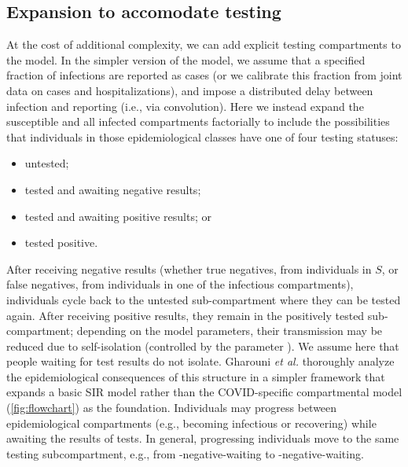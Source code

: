 \documentclass[12pt]{article}\usepackage[]{graphicx}\usepackage[]{color}
\begin{document}
\subsection*{Expansion to accomodate testing}

At the cost of additional complexity, we can add explicit testing compartments to the model.  In the simpler version of the model, we assume that a specified fraction of infections are reported as cases (or we calibrate this fraction from joint data on cases and hospitalizations), and impose a distributed delay between infection and reporting (i.e., via convolution).
Here we instead expand the susceptible and all infected compartments factorially to include the possibilities that individuals in those epidemiological classes have one of four testing statuses:
\begin{itemize}
\item untested;
\item tested and awaiting negative results;
\item tested and awaiting positive results; or 
\item tested positive.
\end{itemize}
After receiving negative results (whether true negatives, from individuals in $S$, or false negatives, from individuals in one of the infectious compartments), individuals cycle back to the untested sub-compartment where they can be tested again. After receiving positive results, they remain in the positively tested sub-compartment; depending on the model parameters, their transmission may be reduced due to self-isolation (controlled by the parameter ).  We assume here that people waiting for test results do not isolate.
Gharouni \emph{et al.}\/ \cite{Ghar+22} thoroughly analyze the epidemiological consequences of this structure in a simpler framework that expands a basic SIR model rather than the COVID-specific compartmental model (\cref{fig:flowchart}) as the foundation.
Individuals may progress between epidemiological compartments (e.g., becoming infectious or recovering) while awaiting the results of tests. In general, progressing individuals move to the same testing subcompartment, e.g., from -negative-waiting to -negative-waiting.
\end{document}
